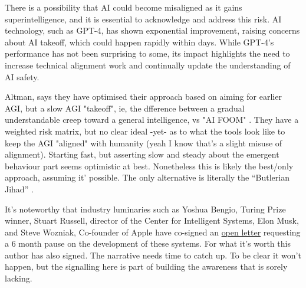 There is a possibility that AI could become misaligned as it gains superintelligence, and it is essential to acknowledge and address this risk. 
AI technology, such as GPT-4, has shown exponential improvement, raising concerns about AI takeoff, which could happen rapidly within days. While GPT-4's performance has not been surprising to some, its impact highlights the need to increase technical alignment work and continually update the understanding of AI safety.\par
Altman, says they have optimised their approach based on aiming for earlier AGI, but a slow AGI "takeoff", ie, the dfference between a gradual understandable creep toward a general intelligence, vs "AI FOOM" \cite{yudkowsky2008hanson}. They have a weighted risk matrix, but no clear ideal -yet- as to what the tools look like to keep the AGI "aligned" with humanity (yeah I know that's a slight misuse of alignment). Starting fast, but asserting slow and steady about the emergent behaviour part seems optimistic at best. Nonetheless this is likely the best/only approach, assuming it' possible. The only alternative is literally the ``Butlerian Jihad'' \cite{song2018preventing}.\par
It's noteworthy that industry luminaries such as Yoshua Bengio, Turing Prize winner, Stuart Russell, director of the Center for Intelligent Systems, Elon Musk, and Steve Wozniak, Co-founder of Apple have co-signed an \href{https://futureoflife.org/open-letter/pause-giant-ai-experiments/}{open letter} requesting a 6 month pause on the development of these systems. For what it's worth this author has also signed. The narrative needs time to catch up. To be clear it won't happen, but the signalling here is part of building the awareness that is sorely lacking. 
